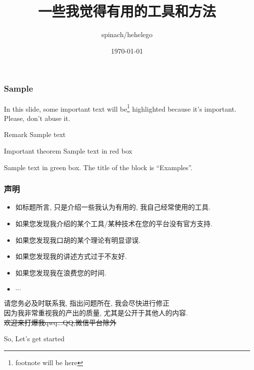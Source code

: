 \documentclass[8pt,t]{beamer}
\date{\today}
\title{一些我觉得有用的工具和方法}
\author{spinach/hehelego}
\institute{GeekPie@ShanghaiTech}
\begin{document}
\begin{frame}
	\titlepage{}
\end{frame}

\begin{frame}
	\frametitle{Sample}

	In this slide, some important text will be\footnote{footnote will be here}
	\alert{highlighted} because it's important.
	Please, don't abuse it.

	\begin{block}{Remark}
		Sample text
	\end{block}

	\begin{alertblock}{Important theorem}
		Sample text in red box
	\end{alertblock}

	\vfill

	\begin{examples}
		Sample text in green box. The title of the block is ``Examples''.
	\end{examples}
\end{frame}

\begin{frame}[c]
	\frametitle{声明}
	\begin{itemize}
		\item 如标题所言, 只是介绍一些我认为有用的, 我自己经常使用的工具.\\
		\item 如果您发现我介绍的某个工具/某种技术在您的平台没有官方支持.
		\item 如果您发现我口胡的某个理论有明显谬误.
		\item 如果您发现我的讲述方式过于不友好.
		\item 如果您发现我在浪费您的时间.
		\item $\cdots$
	\end{itemize}
	\pause{}
	请您务必及时联系我, 指出问题所在, 我会尽快进行修正\\
	因为我非常重视我的产出的质量, 尤其是公开于其他人的内容.\\
	\sout{欢迎来打爆我qwq...QQ,微信平台除外}
	\vfill{}
	\pause{}
	\begin{center}
		So, Let's get started\\
	\end{center}
\end{frame}


\end{document}
